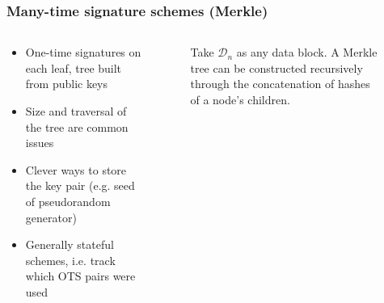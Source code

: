 \documentclass[12pt]{beamer}
\newcommand{\concat}{\, \vert \vert \,}
\newcommand{\hash}[2][]{\mathcal{H}^{#1}(#2)}
\begin{document}
\begin{frame}
  \frametitle{Many-time signature schemes (Merkle)}
  \begin{columns}[T]
    \begin{column}{.45\textwidth}
      \begin{itemize}
        \item One-time signatures on each leaf, tree built from public keys
        \item Size and traversal of the tree are common issues
        \item Clever ways to store the key pair (e.g. seed of pseudorandom generator)
        \item Generally stateful schemes, i.e. track which OTS pairs were used
      \end{itemize}
    \end{column}
    \begin{column}{.4\textwidth}
      \begin{figure}
        \captionsetup{font=scriptsize}
        \caption*{Take $\mathcal{D}_n$ as any data block. A Merkle tree
          can be constructed recursively through the concatenation
          of hashes of a node's children.}
      \end{figure}
    \end{column}
  \end{columns}
\end{frame}
\end{document}

